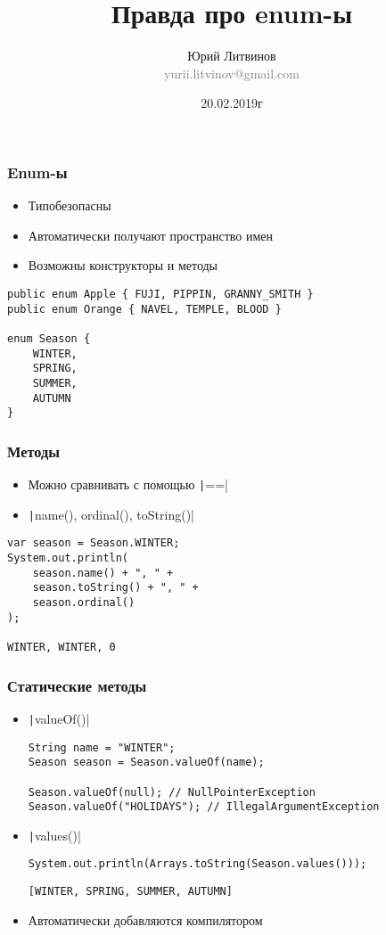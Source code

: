 \documentclass[xetex,mathserif,serif]{beamer}
\title{Правда про enum-ы}
\author[Юрий Литвинов]{Юрий Литвинов\\\small{\textcolor{gray}{yurii.litvinov@gmail.com}}}
\date{20.02.2019г}
\begin{document}
	\frame{\titlepage}

	\begin{frame}[fragile]
		\frametitle{Enum-ы}
		\begin{itemize}
			\item Типобезопасны
			\item Автоматически получают пространство имен
			\item Возможны конструкторы и методы
		\end{itemize}
		\begin{verbatim}
public enum Apple { FUJI, PIPPIN, GRANNY_SMITH }
public enum Orange { NAVEL, TEMPLE, BLOOD }

enum Season {
    WINTER, 
    SPRING,
    SUMMER, 
    AUTUMN
}
		\end{verbatim}
	\end{frame}

	\begin{frame}[fragile]
		\frametitle{Методы}
		\begin{itemize}
			\item Можно сравнивать с помощью \texttt|==|
			\item \texttt|name(), ordinal(), toString()|
		\end{itemize}
		\begin{verbatim}
var season = Season.WINTER; 
System.out.println(
    season.name() + ", " +
    season.toString() + ", " +
    season.ordinal()
);

WINTER, WINTER, 0
		\end{verbatim}
	\end{frame}

	\begin{frame}[fragile]
		\frametitle{Статические методы}
		\begin{itemize}
			\item \texttt|valueOf()|
				\begin{verbatim}
String name = "WINTER"; 
Season season = Season.valueOf(name); 

Season.valueOf(null); // NullPointerException
Season.valueOf("HOLIDAYS"); // IllegalArgumentException
				\end{verbatim}
			\item \texttt|values()|
				\begin{verbatim}
System.out.println(Arrays.toString(Season.values()));
				\end{verbatim}
				\vspace{3mm}
				\begin{verbatim}
[WINTER, SPRING, SUMMER, AUTUMN]
				\end{verbatim}
			\item Автоматически добавляются компилятором
		\end{itemize}
	\end{frame}
\end{document}
